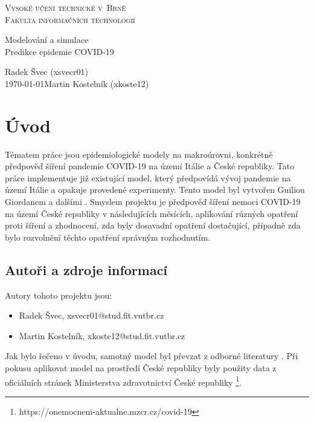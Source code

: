 \documentclass[a4paper,11pt]{article}
\begin{document}
	\begin{titlepage}
		\begin{center}
			\textsc{\Huge Vysoké učení technické v~Brně\\
				\vspace{0.4em}\huge Fakulta informačních technologií}
			
			
			{\LARGE Modelování a simulace\\
				\Huge Predikce epidemie COVID-19\\ \vspace{0.3em}}
			
			
			{\Large \hfill Radek Švec (xsvecr01)\\ \today \hfill Martin Kostelník (xkoste12)}
		\end{center}
	\end{titlepage}

	\section{Úvod}
		Tématem práce jsou epidemiologické modely na makroúrovni, konkrétně předpověď šíření pandemie COVID-19 na území Itálie a České republiky. Tato práce implementuje již existující model, který předpovídá vývoj pandemie na území Itálie a opakuje provedené experimenty. Tento model byl vytvořen Guiliou Giordanem a dalšími \cite{source}. Smyslem projektu je předpověď šíření nemoci COVID-19 na území České republiky v následujících měsících, aplikování různých opatření proti šíření a zhodnocení, zda byly dosavadní opatření dostačující, případně zda bylo rozvolnění těchto opatření správným rozhodnutím.
		
	\subsection{Autoři a zdroje informací}
		Autory tohoto projektu jsou:
		\begin{itemize}
			\item Radek Švec, xsvecr01@stud.fit.vutbr.cz
			\item Martin Kostelník, xkoste12@stud.fit.vutbr.cz
		\end{itemize}
	
	Jak bylo řečeno v úvodu, samotný model byl převzat z odborné literatury \cite{source}. Při pokusu aplikovat model na prostředí České republiky byly použity data z oficiálních stránek Ministerstva zdravotnictví České republiky \footnote{https://onemocneni-aktualne.mzcr.cz/covid-19}.
	
\end{document}
